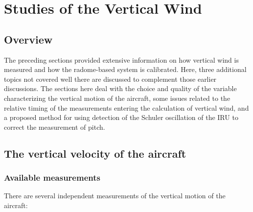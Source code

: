 \documentclass[12pt,twoside,english]{article}\usepackage[]{graphicx}\usepackage[]{color}
\let\stdsection\section
\renewcommand{\section}{\newpage\stdsection}
\let\OrgIndex\index
\renewcommand*{\index}[1]{\OrgIndex{#1}}
\begin{document}
{{%



\section{Studies of the Vertical Wind\label{sec:vertical-wind}}

\subsection{Overview}

The preceding sections provided extensive information on how vertical wind is measured and how the radome-based system is calibrated. Here, three additional topics not covered well there are discussed to complement those earlier discussions. The sections here deal with the choice and quality of the variable characterizing the vertical motion of the aircraft, some issues related to the relative timing of the measurements entering the calculation of vertical wind, and a proposed method for using detection of the Schuler oscillation of the IRU to correct the measurement of pitch. 


\subsection{The vertical velocity of the aircraft\label{sec:VerticalVelocity}}


\subsubsection{Available measurements}

There are several independent measurements of the vertical motion of the aircraft: 

}}
\end{document}
